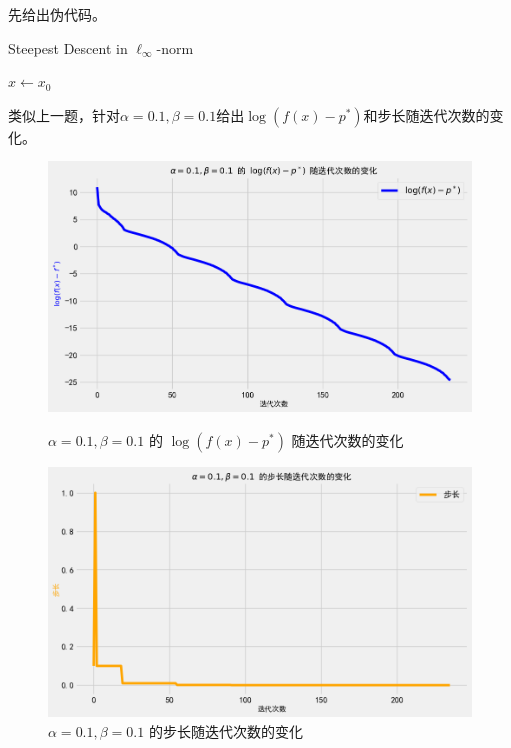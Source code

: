 \documentclass{homework}
\begin{document}
\begin{sol}
    先给出伪代码。
    
    \begin{algorithm}[H]
\caption{Steepest Descent in $\ell_\infty$-norm}
$x \leftarrow x_0$\;
\end{algorithm}

类似上一题，针对$\alpha = 0.1, \beta = 0.1$给出$\log(f(x)-p^*)$和步长随迭代次数的变化。
\begin{figure}[h]
    \centering
    \begin{minipage}[t]{0.48\textwidth}
        \centering
        \includegraphics[width=\linewidth]{4-1.png}
        \caption{$\alpha=0.1, \beta=0.1$ 的 $\log(f(x) - p^*)$ 随迭代次数的变化}
    \end{minipage}
    \hfill %
    \begin{minipage}[t]{0.48\textwidth}
        \centering
        \includegraphics[width=\linewidth]{4-2.png}
        \caption{$\alpha=0.1, \beta=0.1$ 的步长随迭代次数的变化}
    \end{minipage}
\end{figure}


\end{sol}
\end{document}
